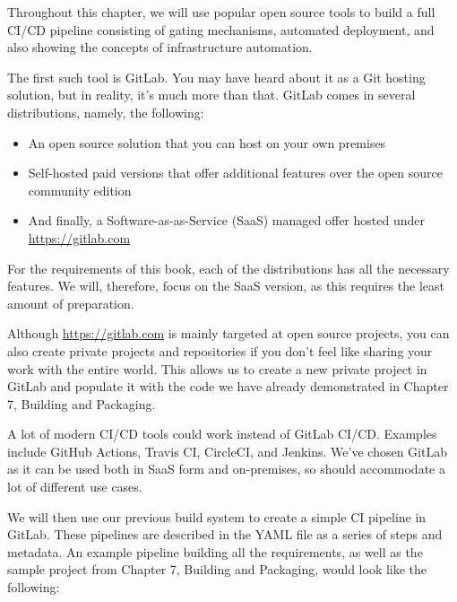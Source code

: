 
Throughout this chapter, we will use popular open source tools to build a full CI/CD pipeline consisting of gating mechanisms, automated deployment, and also showing the concepts of infrastructure automation.

The first such tool is GitLab. You may have heard about it as a Git hosting solution, but in reality, it's much more than that. GitLab comes in several distributions, namely, the following:

\begin{itemize}
\item 
An open source solution that you can host on your own premises

\item 
Self-hosted paid versions that offer additional features over the open source community edition

\item 
And finally, a Software-as-as-Service (SaaS) managed offer hosted under \url{https://gitlab.com}
\end{itemize}

For the requirements of this book, each of the distributions has all the necessary features. We will, therefore, focus on the SaaS version, as this requires the least amount of preparation.

Although \url{https://gitlab.com} is mainly targeted at open source projects, you can also create private projects and repositories if you don't feel like sharing your work with the entire world. This allows us to create a new private project in GitLab and populate it with the code we have already demonstrated in Chapter 7, Building and Packaging.

A lot of modern CI/CD tools could work instead of GitLab CI/CD. Examples include GitHub Actions, Travis CI, CircleCI, and Jenkins. We've chosen GitLab as it can be used both in SaaS form and on-premises, so should accommodate a lot of different use cases.

We will then use our previous build system to create a simple CI pipeline in GitLab. These pipelines are described in the YAML file as a series of steps and metadata. An example pipeline building all the requirements, as well as the sample project from Chapter 7, Building and Packaging, would look like the following:

